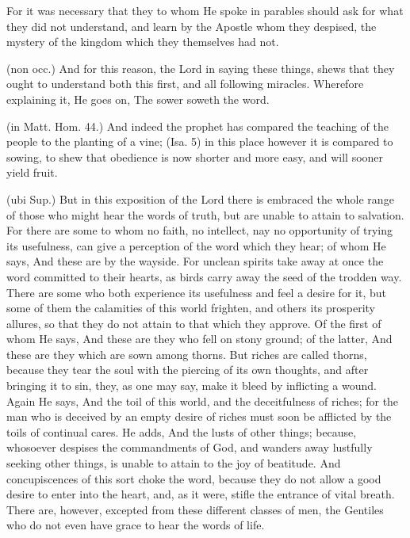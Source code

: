  For it was necessary that they to whom He spoke in parables should ask for what they did not understand, and learn by the Apostle whom they despised, the mystery of the kingdom which they themselves had not.

 (non occ.) And for this reason, the Lord in saying these things, shews that they ought to understand both this first, and all following miracles. Wherefore explaining it, He goes on, The sower soweth the word.

 (in Matt. Hom. 44.) And indeed the prophet has compared the teaching of the people to the planting of a vine; (Isa. 5) in this place however it is compared to sowing, to shew that obedience is now shorter and more easy, and will sooner yield fruit.

 (ubi Sup.) But in this exposition of the Lord there is embraced the whole range of those who might hear the words of truth, but are unable to attain to salvation. For there are some to whom no faith, no intellect, nay no opportunity of trying its usefulness, can give a perception of the word which they hear; of whom He says, And these are by the wayside. For unclean spirits take away at once the word committed to their hearts, as birds carry away the seed of the trodden way. There are some who both experience its usefulness and feel a desire for it, but some of them the calamities of this world frighten, and others its prosperity allures, so that they do not attain to that which they approve. Of the first of whom He says, And these are they who fell on stony ground; of the latter, And these are they which are sown among thorns. But riches are called thorns, because they tear the soul with the piercing of its own thoughts, and after bringing it to sin, they, as one may say, make it bleed by inflicting a wound. Again He says, And the toil of this world, and the deceitfulness of riches; for the man who is deceived by an empty desire of riches must soon be afflicted by the toils of continual cares. He adds, And the lusts of other things; because, whosoever despises the commandments of God, and wanders away lustfully seeking other things, is unable to attain to the joy of beatitude. And concupiscences of this sort choke the word, because they do not allow a good desire to enter into the heart, and, as it were, stifle the entrance of vital breath. There are, however, excepted from these different classes of men, the Gentiles who do not even have grace to hear the words of life.

